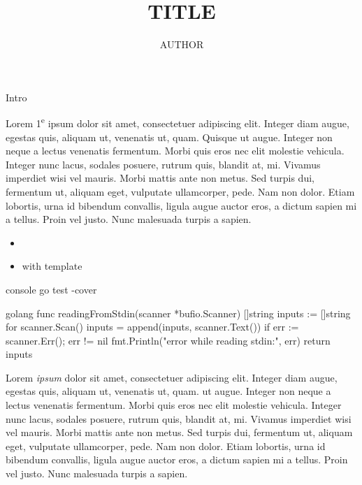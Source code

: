 \documentclass[small]{zmdocument}
\title{TITLE}
\author{AUTHOR}
\begin{document}
\maketitle
\tableofcontents

Intro


Lorem 1\textsuperscript{e} ipsum dolor sit amet, consectetuer adipiscing elit. Integer diam augue, egestas quis, aliquam ut, venenatis ut, quam. Quisque ut augue. Integer non neque a lectus venenatis fermentum. Morbi quis eros nec elit molestie vehicula. Integer nunc lacus, sodales posuere, rutrum quis, blandit at, mi. Vivamus imperdiet wisi vel mauris. Morbi mattis ante non metus. Sed turpis dui, fermentum ut, aliquam eget, vulputate ullamcorper, pede. Nam non dolor. Etiam lobortis, urna id bibendum convallis, ligula augue auctor eros, a dictum sapien mi a tellus. Proin vel justo. Nunc malesuada turpis a sapien.


\begin{itemize}
    \item\relax {}
    \item\relax {} with template
\end{itemize}

\begin{CodeBlock}{console}
go test -cover
\end{CodeBlock}


\begin{CodeBlock}{golang}
func readingFromStdin(scanner *bufio.Scanner) []string {
	inputs := []string{}
	for scanner.Scan() {
		inputs = append(inputs, scanner.Text())
	}
	if err := scanner.Err(); err != nil {
		fmt.Println("error while reading stdin:", err)
	}
	return inputs
}
\end{CodeBlock}

Lorem \textit{ipsum} dolor sit amet, consectetuer adipiscing elit. Integer diam augue, egestas quis, aliquam ut, venenatis ut, quam.  ut augue. Integer non neque a lectus venenatis fermentum. Morbi quis eros nec elit molestie vehicula. Integer nunc lacus, sodales posuere, rutrum quis, blandit at, mi. Vivamus imperdiet wisi vel mauris. Morbi mattis ante non metus. Sed turpis dui, fermentum ut, aliquam eget, vulputate ullamcorper, pede. Nam non dolor. Etiam lobortis, urna id bibendum convallis, ligula augue auctor eros, a dictum sapien mi a tellus. Proin vel justo. Nunc malesuada turpis a sapien.
\end{document}
